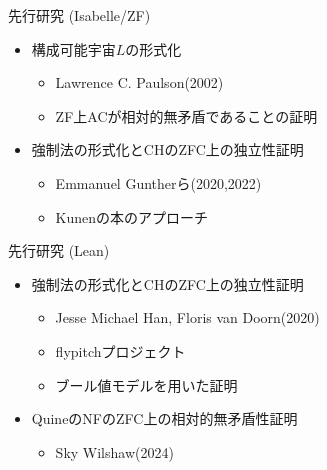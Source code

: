 \documentclass[17pt,aspectratio=169]{beamer}
\begin{document}
\begin{frame}{先行研究 (Isabelle/ZF)}


    \begin{itemize}
        \item 構成可能宇宙$L$の形式化
              {\small \begin{itemize}
                  \item Lawrence C. Paulson(2002)
                  \item ZF上ACが相対的無矛盾であることの証明
              \end{itemize} }

        \item 強制法の形式化とCHのZFC上の独立性証明
              {\small \begin{itemize}
                  \item Emmanuel Guntherら(2020,2022)
                  \item Kunenの本のアプローチ
              \end{itemize} }

    \end{itemize}
\end{frame}


\begin{frame}{先行研究 (Lean)}
    \vspace{10pt}

    \begin{itemize}
        \item 強制法の形式化とCHのZFC上の独立性証明
              {\small \begin{itemize}
                  \item Jesse Michael Han, Floris van Doorn(2020)
                  \item flypitchプロジェクト
                  \item ブール値モデルを用いた証明
              \end{itemize} }

        \item QuineのNFのZFC上の相対的無矛盾性証明
              {\small \begin{itemize}
                  \item Sky Wilshaw(2024)
              \end{itemize} }

    \end{itemize}
\end{frame}
\end{document}

